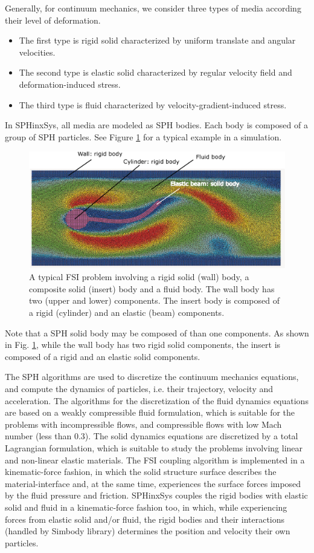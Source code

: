 \documentclass[12pt, a4paper,onecolumn]{article}
\begin{document}
Generally, for continuum mechanics, 
we consider three types of media according their level of deformation.
\begin{itemize}
	\item The first type is rigid solid characterized by uniform translate and angular velocities. 
	\item The second type  is elastic solid characterized by regular velocity field and deformation-induced stress.
	\item The third type is fluid characterized by velocity-gradient-induced stress.
\end{itemize}
In SPHinxSys, all media are modeled as SPH bodies. 
Each body is composed of a group of SPH particles.
See Figure \ref{figs:fsi} for a typical example in a simulation.  
%
\begin{figure}[tb!]
	\centering
	\includegraphics[width=\textwidth]{figs/fsi.eps}
	\caption{A typical FSI problem involving a rigid solid (wall) body, 
		a composite solid (insert) body and a fluid body. The wall body has two (upper and lower) components. 
		The insert body is composed of a rigid (cylinder) and an elastic (beam) components.}
	\label{figs:fsi}
\end{figure}
%
Note that a SPH solid body may be composed of than one components.
As shown in Fig. \ref{figs:fsi}, 
while the wall body has two rigid solid components,
the insert is composed of a rigid and an elastic solid components.

The SPH algorithms are used to discretize the continuum mechanics equations, 
and compute the dynamics of particles, i.e. their trajectory, velocity and acceleration. 
The algorithms for the discretization of the fluid dynamics equations are based on a weakly compressible fluid formulation, which is suitable for the problems with incompressible flows, and compressible flows with low Mach number (less than 0.3). The solid dynamics equations are discretized by a total Lagrangian formulation, which is suitable to study the problems involving linear and non-linear elastic materials. The FSI coupling algorithm is implemented in a kinematic-force fashion, in which the solid structure surface describes the material-interface and, at the same time, experiences the surface forces imposed by the fluid pressure and friction. 
SPHinxSys couples the rigid bodies with elastic solid and fluid in a kinematic-force fashion too,
in which, while experiencing forces from elastic solid and/or fluid, 
the rigid bodies and their interactions (handled by Simbody library) 
determines the position and velocity their own particles. 
%
\end{document}
